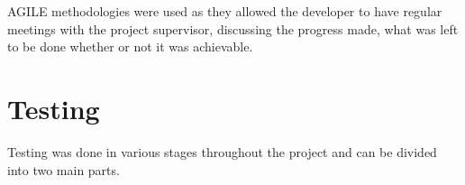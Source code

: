 AGILE methodologies were used as they allowed the developer to have regular meetings with the project supervisor, discussing the progress made, what was left to be done whether or not it was achievable.

\section{Testing}

Testing was done in various stages throughout the project and can be divided into two main parts. 